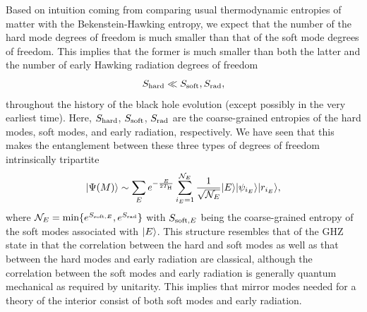 \documentclass[12pt]{article}
\begin{document}
Based on intuition coming from comparing usual thermodynamic 
entropies of matter with the Bekenstein-Hawking entropy, we expect 
that the number of the hard mode degrees of freedom is much smaller 
than that of the soft mode degrees of freedom.  This implies that 
the former is much smaller than both the latter and the number of 
early Hawking radiation degrees of freedom
%
\begin{equation}
  S_{\rm hard} \ll S_{\rm soft}, S_{\rm rad},
\label{eq:S-rel-concl}
\end{equation}
%
throughout the history of the black hole evolution (except possibly 
in the very earliest time).  Here, $S_{\rm hard}$, $S_{\rm soft}$, 
$S_{\rm rad}$ are the coarse-grained entropies of the hard modes, 
soft modes, and early radiation, respectively.  We have seen that 
this makes the entanglement between these three types of degrees 
of freedom intrinsically tripartite
%
\begin{equation}
  \ket{\Psi(M)} \sim 
    \sum_E e^{-\frac{E}{2 T_{\rm H}}} 
    \sum_{i_E=1}^{{\cal N}_E} \frac{1}{\sqrt{{\cal N}_E}} 
    \ket{E} \ket{\psi_{i_E}} \ket{r_{i_E}},
\label{eq:GHZ-concl}
\end{equation}
%
where ${\cal N}_E = {\rm min}\{ e^{S_{{\rm soft},E}}, e^{S_{\rm rad}} 
\}$ with $S_{{\rm soft},E}$ being the coarse-grained entropy of the 
soft modes associated with $| E \rangle$.  This structure resembles that 
of the GHZ state in that the correlation between the hard and soft 
modes as well as that between the hard modes and early radiation 
are classical, although the correlation between the soft modes 
and early radiation is generally quantum mechanical as required 
by unitarity.  This implies that mirror modes needed for a theory 
of the interior consist of both soft modes and early radiation.
\end{document}
